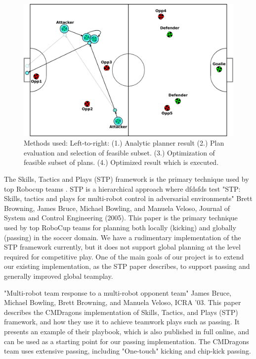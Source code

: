 \documentclass[a4paper, 10pt, conference]{ieeeconf}      %
\begin{document}
\begin{figure}[ht!]
\begin{center}
\includegraphics[totalheight=1.0in]{plan4_resized}
\end{center}
\caption{Methods used: Left-to-right: (1.) Analytic planner result (2.) Plan evaluation and selection of feasible subset. (3.) Optimization of feasible subset of plans. (4.) Optimized result which is executed.}
\end{figure}

The Skills, Tactics and Plays (STP) framework is the primary technique used by top Robocup teams \cite{cmdragonsETD, skubaETD}. STP is a hierarchical approach where 
dfdsfds test \cite{browning2005stp,bruce2003multi,zickler2008playing,bruce2003real}
"STP: Skills, tactics and plays for multi-robot control in adversarial environments" Brett Browning, James Bruce, Michael Bowling, and Manuela Veloso, Journal of System and Control Engineering (2005). This paper is the primary technique used by top RoboCup teams for planning both locally (kicking) and globally (passing) in the soccer domain. We have a rudimentary implementation of the STP framework currently, but it does not support global planning at the level required for competitive play. One of the main goals of our project is to extend our existing implementation, as the STP paper describes, to support passing and generally improved global teamplay.

"Multi-robot team response to a multi-robot opponent team" James Bruce, Michael Bowling, Brett Browning, and Manuela Veloso, ICRA '03. This paper describes the CMDragons implementation of Skills, Tactics, and Plays (STP) framework, and how they use it to achieve teamwork plays such as passing. It presents an example of their playbook, which is also published in full online, and can be used as a starting point for our passing implementation. The CMDragons team uses extensive passing, including "One-touch" kicking and chip-kick passing.
\end{document}
